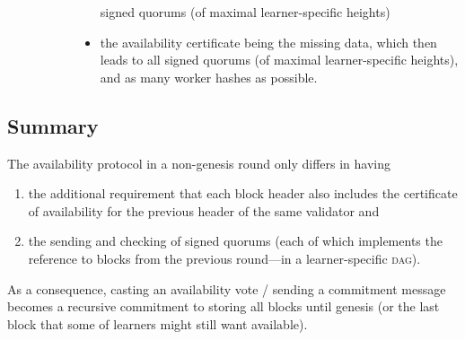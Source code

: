 \documentclass[%
dvipsnames]{article}
\theoremstyle{definition}
\newcommand{\xnote}[1]{
  \marginnote{\footnotesize #1}%
}
\newcommand{\Dag}[1][]{\textsc{dag}#1\xspace}
\newcommand{\ie}[1][, ]{\emph{i.e.}#1}
\begin{document}
\begin{description}
\begin{description}
\begin{itemize}
      signed quorums (of maximal learner-specific heights)
    \item the availability certificate being the missing data,
      which then leads to all
      signed quorums (of maximal learner-specific heights),
      and as many worker hashes as possible. 
    \end{itemize}
  \end{description}


\end{description}



\subsection{Summary}
The availability protocol in a non-genesis round
only differs in having
\begin{enumerate}
\item the additional requirement
that each block header also includes
the certificate of availability
for the previous header of the same validator and
\item
the sending and checking of signed quorums
(each of which implements the reference to
blocks from the previous round—in a learner-specific \Dag).
\end{enumerate}

As a consequence,
casting an availability vote / sending a commitment message
becomes a recursive commitment
to storing all blocks until genesis
(or the last block that some of learners might still want available).
\end{document}
